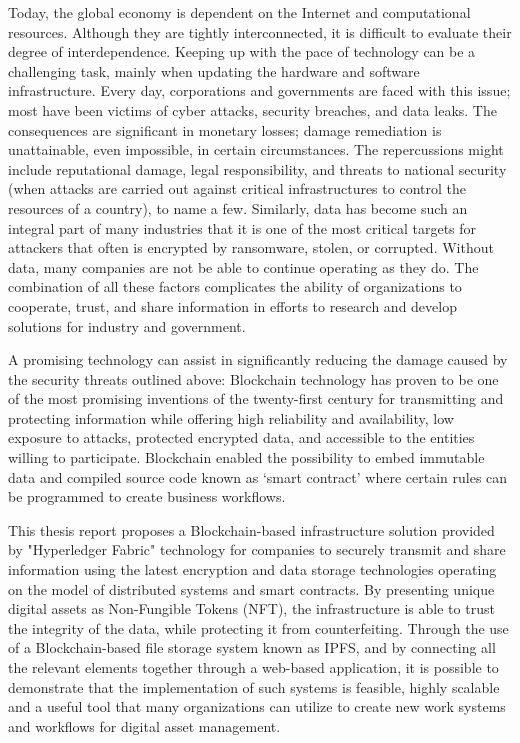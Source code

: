 
\abstract

Today, the global economy is dependent on the Internet and computational resources. Although they are tightly interconnected, it is difficult to evaluate their degree of interdependence. 
Keeping up with the pace of technology can be a challenging task, mainly when updating the hardware and software infrastructure. Every day, corporations and governments are faced with this issue; most have been victims of cyber attacks, security breaches, and data leaks. The consequences are significant in monetary losses; damage remediation is unattainable, even impossible, in certain circumstances. The repercussions might include reputational damage, legal responsibility, and threats to national security (when attacks are carried out against critical infrastructures to control the resources of a country), to name a few.
Similarly, data has become such an integral part of many industries that it is one of the most critical targets for attackers that often is encrypted by ransomware, stolen, or corrupted. Without data, many companies are not be able to continue operating as they do. 
The combination of all these factors complicates the ability of organizations to cooperate, trust, and share information in efforts to research and develop solutions for industry and government.
\newline

A promising technology can assist in significantly reducing the damage caused by the security threats outlined above: Blockchain technology has proven to be one of the most promising inventions of the twenty-first century for transmitting and protecting information while offering high reliability and availability, low exposure to attacks, protected encrypted data, and accessible to the entities willing to participate.
Blockchain enabled the possibility to embed immutable data and compiled source code known as ‘smart contract’ where certain rules can be programmed to create business workflows. 

\newline
This thesis report proposes a Blockchain-based infrastructure solution provided by  "Hyperledger Fabric" technology for companies to securely transmit and share information using the latest encryption and data storage technologies operating on the model of distributed systems and smart contracts. By presenting unique digital assets as Non-Fungible Tokens (NFT), the infrastructure is able to trust the integrity of the data, while protecting it from counterfeiting. Through the use of a Blockchain-based file storage system known as IPFS, and by connecting all the relevant elements together through a web-based application, it is possible to demonstrate that the implementation of such systems is feasible, highly scalable and a useful tool that many organizations can utilize to create new work systems and workflows for digital asset management.
